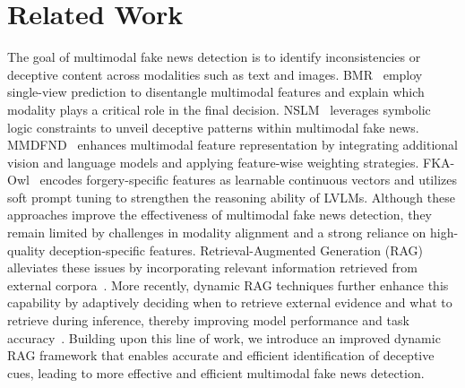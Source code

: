 \section{Related Work}

The goal of multimodal fake news detection is to identify inconsistencies or deceptive content across modalities such as text and images. BMR~\cite{ying2023bootstrapping} employ single-view prediction to disentangle multimodal features and explain which modality plays a critical role in the final decision. NSLM~\cite{dong2024unveiling} leverages symbolic logic constraints to unveil deceptive patterns within multimodal fake news. MMDFND~\cite{tong2024mmdfnd} enhances multimodal feature representation by integrating additional vision and language models and applying feature-wise weighting strategies. FKA-Owl~\cite{liu2024fka} encodes forgery-specific features as learnable continuous vectors and utilizes soft prompt tuning to strengthen the reasoning ability of LVLMs. Although these approaches improve the effectiveness of multimodal fake news detection, they remain limited by challenges in modality alignment and a strong reliance on high-quality deception-specific features. Retrieval-Augmented Generation (RAG) alleviates these issues by incorporating relevant information retrieved from external corpora~\cite{rag1,rag2,rag3,rag4,rag5,rag6}. More recently, dynamic RAG techniques further enhance this capability by adaptively deciding when to retrieve external evidence and what to retrieve during inference, thereby improving model performance and task accuracy~\cite{drag1,drag3,drag4,drag5}. Building upon this line of work, we introduce an improved dynamic RAG framework that enables accurate and efficient identification of deceptive cues, leading to more effective and efficient multimodal fake news detection.

